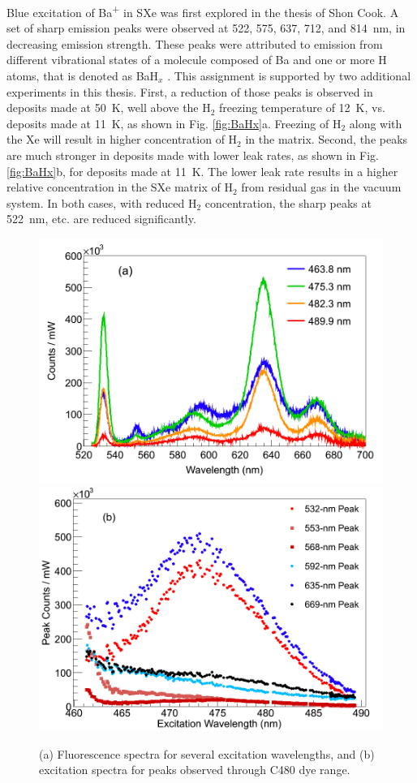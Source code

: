 
Blue excitation of Ba\textsuperscript{+} in SXe was first explored in the thesis of Shon Cook.  A set of sharp emission peaks were observed at 522, 575, 637, 712, and 814~nm, in decreasing emission strength.  These peaks were attributed to emission from different vibrational states of a molecule composed of Ba and one or more H atoms, that is denoted as BaH$_{x}$ \cite{Shon}.  This assignment is supported by two additional experiments in this thesis.  First, a reduction of those peaks is observed in deposits made at 50~K, well above the H$_{2}$ freezing temperature of 12~K, vs. deposits made at 11~K, as shown in Fig. \ref{fig:BaHx}a.  Freezing of H$_2$ along with the Xe will result in higher concentration of H$_2$ in the matrix.  Second, the peaks are much stronger in deposits made with lower leak rates, as shown in Fig. \ref{fig:BaHx}b, for deposits made at 11~K.  The lower leak rate results in a higher relative concentration in the SXe matrix of H$_2$ from residual gas in the vacuum system.  In both cases, with reduced H$_2$ concentration, the sharp peaks at 522~nm, etc. are reduced significantly.

\begin{figure} %
        \centering
                \includegraphics[width=.7\textwidth]{figures/excitspec_blu_a.png}
                \includegraphics[width=.7\textwidth]{figures/excitspecBlue_b.png}
                \caption{(a) Fluorescence spectra for several excitation wavelengths, and (b) excitation spectra for peaks observed through C480 dye range. \cite{Mong2015}}
\label{fig:excitspecBlue}
\end{figure}

